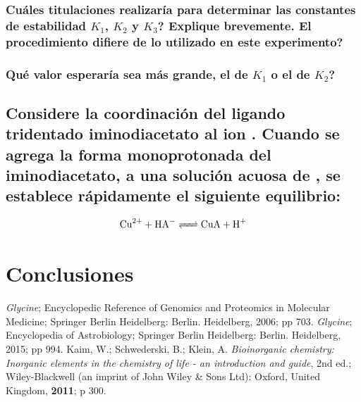 \documentclass[fleqn,10pt]{SelfArx} %
\begin{document}
	\subsubsection{Cu\'ales titulaciones realizar\'ia para determinar las constantes de estabilidad $K_1$, $K_2$ y $K_3$? Explique brevemente. El procedimiento difiere de lo utilizado en este experimento?}
	\subsubsection{Qu\'e valor esperar\'ia sea m\'as grande, el de $K_1$ o el de $K_2$?}
	
	\subsection{Considere la coordinaci\'on del ligando tridentado iminodiacetato al ion . Cuando se agrega la forma monoprotonada del iminodiacetato, a una soluci\'on acuosa de , se establece r\'apidamente el siguiente equilibrio:}
	\begin{equation}
	    \ce{Cu^{2+} + HA- <=> CuA + H+}
	\end{equation}
	
	\section{Conclusiones}
	
	
	\begin{thebibliography}{9}
	    \textit{Glycine}; Encyclopedic Reference of Genomics and Proteomics in Molecular Medicine; Springer Berlin Heidelberg: Berlin. Heidelberg, 2006; pp 703.
	    \textit{Glycine}; Encyclopedia of Astrobiology; Springer Berlin Heidelberg: Berlin. Heidelberg, 2015; pp 994.
	    Kaim, W.; Schwederski, B.; Klein, A. \textit{Bioinorganic chemistry: Inorganic elements in the chemistry of life - an introduction and guide}, 2nd ed.; Wiley-Blackwell (an imprint of John Wiley \& Sons Ltd): Oxford, United Kingdom, \textbf{2011}; p 300.
	\end{thebibliography}
\end{document}
